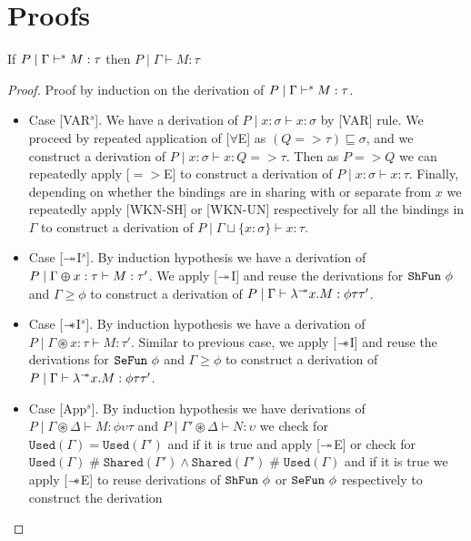 \chapter{Proofs}\label{chp:proofs}
\begin{theorem}\label{thm:soundness-syntax-directed}
   If $P \mid \Gamma \vdash^s M:\tau$ then $P \mid \Gamma \vdash M:\tau$
\end{theorem}
\begin{proof}\label{prf:soundness-syntax-directed}
  Proof by induction on the derivation of $P \mid \Gamma \vdash^s M:\tau$.
  \begin{itemize}
  \item{Case [VAR$^s$].}
    We have a derivation of $P \mid x:\sigma \vdash x:\sigma$ by [VAR] rule.
    We proceed by repeated application of [$\forall$E] as $(Q => \tau) \sqsubseteq \sigma$, and
    we construct a derivation of $P \mid x:\sigma \vdash x: Q => \tau$. Then as $P => Q$ we can
    repeatedly apply [$=>$E] to construct a derivation of $P \mid x:\sigma \vdash x:\tau$.
    Finally, depending on whether the bindings are in sharing with or separate from
    $x$ we repeatedly apply [WKN-SH] or [WKN-UN] respectively for all the bindings in $\Gamma$ to construct
    a derivation of $P \mid \Gamma \sqcup \{x:\sigma\} \vdash x:\tau$.
  \item{Case [$\twoheadrightarrow$I$^s$].}
    By induction hypothesis we have a derivation of $P \mid \Gamma \varoplus x:\tau \vdash M:\tau'$.
    We apply [$\twoheadrightarrow$I] and reuse the derivations for $\texttt{ShFun}\ \phi$ and $\Gamma \geq \phi$  to
    construct a derivation of $P \mid \Gamma \vdash \lambda^{\twoheadrightarrow}x. M: \phi \tau \tau'$.
  \item{Case [$\mathrel{-\mkern-6mu*}$I$^s$].}
    By induction hypothesis we have a derivation of $P \mid \Gamma \circledast x:\tau \vdash M:\tau'$.
    Similar to previous case, we apply [$\mathrel{-\mkern-6mu*}$I] and reuse the derivations for $\texttt{SeFun}\ \phi$ and $\Gamma \geq \phi$  to
    construct a derivation of $P \mid \Gamma \vdash \lambda^{\mathrel{-\mkern-6mu*}}x. M: \phi \tau \tau'$.
  \item{Case [App$^s$].}
    By induction hypothesis we have derivations of $P \mid \Gamma \circledast \Delta \vdash M: \phi \upsilon \tau$ and
    $P \mid \Gamma' \circledast \Delta \vdash N: \upsilon$ we check for $\texttt{Used}(\Gamma) = \texttt{Used}(\Gamma')$ and if it is true
    and apply [$\twoheadrightarrow$E] or check for $\texttt{Used}(\Gamma) \mathbin{\#}\texttt{Shared}(\Gamma') \wedge \texttt{Shared}(\Gamma') \mathbin{\#}\texttt{Used}(\Gamma)$
    and if it is true we apply [$\mathrel{-\mkern-6mu*}$E] to reuse derivations of $\texttt{ShFun}\ \phi$ or $\texttt{SeFun}\ \phi$ respectively to construct the derivation

\end{itemize}
\end{proof}
